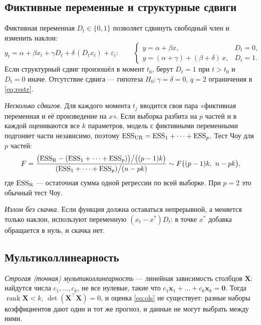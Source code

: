 \subsection{Фиктивные переменные и структурные сдвиги}\label{sec:dummy}

Фиктивная переменная $D_t \in \{0, 1\}$ позволяет сдвинуть свободный член и
изменить наклон:
\begin{equation}
  y_t = \alpha + \beta x_t + \gamma D_t + \delta\,(D_tx_t) + \varepsilon_t :
  \qquad
  \begin{cases}
    y = \alpha + \beta x, & D_t = 0, \\[2pt]
    y = (\alpha + \gamma) + (\beta + \delta)\,x, & D_t = 1 .
  \end{cases}
  \label{eq:dummy}
\end{equation}
Если структурный сдвиг произошёл в момент $t_0$, берут $D_t = 1$ при
$t > t_0$ и $D_t = 0$ иначе. Отсутствие сдвига — гипотеза
$H_0\colon \gamma = \delta = 0$, $q = 2$ ограничения в \eqref{eq:restr}.

\emph{Несколько сдвигов.} Для каждого момента $t_j$ вводится своя пара
«фиктивная переменная и её произведение на $x$». Если выборка разбита на $p$
частей и в каждой оцениваются все $k$ параметров, модель с фиктивными
переменными подгоняет части независимо, поэтому
$\mathrm{ESS}_{\mathrm{UR}} = \mathrm{ESS}_1 + \dots + \mathrm{ESS}_p$. Тест Чоу для $p$ частей:
\begin{equation}
  F = \frac{\bigl(\mathrm{ESS}_{\mathrm{R}} - (\mathrm{ESS}_1 + \dots + \mathrm{ESS}_p)\bigr)\big/\bigl((p-1)k\bigr)}
           {(\mathrm{ESS}_1 + \dots + \mathrm{ESS}_p)\big/(n - pk)}
  \sim F\bigl((p-1)k,\ n - pk\bigr),
  \label{eq:chow}
\end{equation}
где $\mathrm{ESS}_{\mathrm{R}}$ — остаточная сумма одной регрессии по всей выборке.
При $p = 2$ это обычный тест Чоу.

\emph{Излом без скачка.} Если функция должна оставаться непрерывной, а
меняется только наклон, используют переменную $(x_t - x^{*})D_t$: в точке
$x^{*}$ добавка обращается в нуль, и скачка нет.

\subsection{Мультиколлинеарность}\label{sec:mc}

\emph{Строгая (точная) мультиколлинеарность} — линейная зависимость столбцов
$\mathbf{X}$: найдутся числа $c_1, \dots, c_k$, не все нулевые, такие что
$c_1\mathbf{x}_1 + \dots + c_k\mathbf{x}_k = \mathbf{0}$. Тогда
$\operatorname{rank}\mathbf{X} < k$, $\det(\mathbf{X}^{\top}\mathbf{X}) = 0$, и
оценка \eqref{eq:ols} не существует: разные наборы коэффициентов дают один и
тот же прогноз, и данные не могут выбрать между ними.

